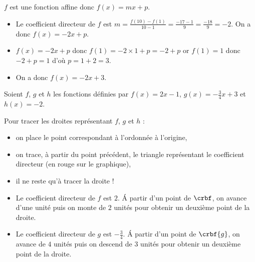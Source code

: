 %
%
%
\begin{exr}
$f$ est une fonction affine donc $f(x)=mx+p$.
    \begin{itemize}
    \item Le coefficient directeur de $f$ est $m=\frac{f(10)-f(1)}{10-1}=\frac{-17-1}{9}=\frac{-18}{9}=-2$. 
    On a donc $f(x)=-2x+p$.
    \item $f(x)=-2x+p$ donc $f(1)=-2\times1+p=-2+p$ or $f(1)=1$ donc $-2+p=1$ d'où $p=1+2=3$.
    \item On a donc $f(x)=-2x+3$.
    \end{itemize}
\end{exr}
%
%
\begin{exr}
Soient $f$, $g$ et $h$ les fonctions définies par  $f(x)=2x-1$, $g(x)=-\frac34x+3$ et $h(x) = -2$.

Pour tracer les droites représentant $f$, $g$ et $h$ :
    \begin{itemize}
    \item on place le point correspondant à l'ordonnée à l'origine,
    \item on trace, à partir du point précédent, le triangle  représentant le coefficient directeur (en rouge sur le graphique),
    \item il ne reste qu'à tracer la droite !
    \end{itemize}
    
    \begin{rmq}
        \begin{itemize}
        \item Le coefficient directeur de $f$ est $2$. \'A partir d'un point de $\crbf$, on avance d'une unité puis on monte de $2$ unités pour obtenir un deuxième point de la droite.
        \item Le coefficient directeur de $g$ est $-\frac34$. \'A partir d'un point de $\crbf{g}$, on avance de $4$ unités puis on descend de $3$ unités pour obtenir un deuxième point de la droite.
        \end{itemize}
    \end{rmq}
\end{exr}
